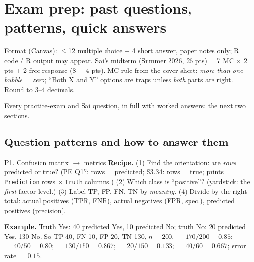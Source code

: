 \section{Exam prep: past questions, patterns, quick answers}

{\small Format (Canvas): $\le$12 multiple choice + 4 short answer, paper notes only; R code / R output may appear.
Sai's midterm (Summer 2026, 26 pts) = 7 MC $\times$ 2 pts + 2 free-response (8 + 4 pts). MC rule from the cover sheet:
\emph{more than one bubble = zero}; ``Both X and Y'' options are traps unless \emph{both} parts are right. Round to 3--4 decimals.\par}

{\small Every practice-exam and Sai question, in full with worked answers: the next two sections.\par}

\subsection{Question patterns and how to answer them}

\begin{topic}{P1. Confusion matrix $\to$ metrics }
\textbf{Recipe.} (1) Find the orientation: are \emph{rows} predicted or true? (PE Q17: rows = predicted;
S3.34: rows = true;  prints \texttt{Prediction} rows $\times$ \texttt{Truth} columns.)
(2) Which class is ``positive''? (yardstick: the \emph{first} factor level.) (3) Label TP, FP, FN, TN by
\emph{meaning}. (4) Divide by the right total: actual positives (TPR, FNR), actual negatives (FPR, spec.),
predicted positives (precision).
\par\textbf{Example.} Truth Yes: 40 predicted Yes, 10 predicted No; truth No: 20 predicted Yes, 130 No. So TP 40, FN 10,
FP 20, TN 130, $n=200$.
 $=170/200=0.85$;  $=40/50=0.80$;  $=130/150=0.867$;
 $=20/150=0.133$;  $=40/60=0.667$; error rate $=0.15$.
\end{topic}

